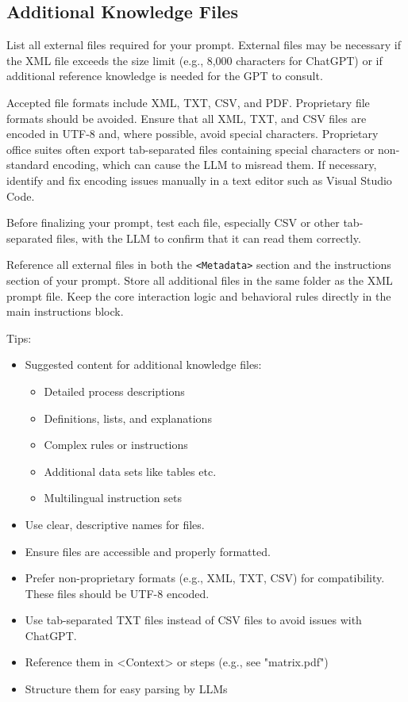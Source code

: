 \documentclass[a4paper,11pt]{refart}
\begin{document}
\subsection{Additional Knowledge Files}\label{sec:additional-knowledge-files}
List all external files required for your prompt. External files may be necessary if the XML file exceeds the size limit (e.g., 8,000 characters for ChatGPT) or if additional reference knowledge is needed for the GPT to consult.

Accepted file formats include XML, TXT, CSV, and PDF. Proprietary file formats should be avoided. Ensure that all XML, TXT, and CSV files are encoded in UTF-8 and, where possible, avoid special characters. Proprietary office suites often export tab-separated files containing special characters or non-standard encoding, which can cause the LLM to misread them. If necessary, identify and fix encoding issues manually in a text editor such as Visual Studio Code.

Before finalizing your prompt, test each file, especially CSV or other tab-separated files, with the LLM to confirm that it can read them correctly.

Reference all external files in both the \lstinline!<Metadata>! section and the instructions section of your prompt. Store all additional files in the same folder as the XML prompt file. Keep the core interaction logic and behavioral rules directly in the main instructions block.

Tips:
\begin{itemize}
  \item Suggested content for additional knowledge files:
  \begin{itemize}
    \item Detailed process descriptions
    \item Definitions, lists, and explanations
    \item Complex rules or instructions
    \item Additional data sets like tables etc.
    \item Multilingual instruction sets  
  \end{itemize}
  \item Use clear, descriptive names for files.
  \item Ensure files are accessible and properly formatted.
  \item Prefer non-proprietary formats (e.g., XML, TXT, CSV) for compatibility. These files should be UTF-8 encoded.
  \item Use tab-separated TXT files instead of CSV files to avoid issues with ChatGPT.
  \item Reference them in <Context> or steps (e.g., see "matrix.pdf")
  \item Structure them for easy parsing by LLMs
\end{itemize}
  
\end{document}
